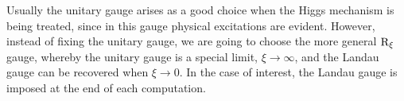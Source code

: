 Usually the unitary gauge arises as a good choice when the Higgs mechanism is being treated, since in this gauge physical excitations are evident. However, instead of fixing the unitary gauge, we are going to choose the more general $\mathrm{R}_{\xi}$ gauge, whereby the unitary gauge is a special limit, $\xi \to \infty$, and the Landau gauge can be recovered when $\xi \to 0$. In the case of interest, the Landau gauge is imposed at the end of each computation. 

